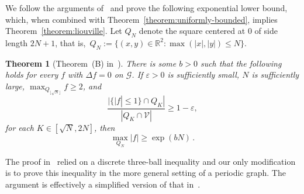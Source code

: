 \documentclass{daj}
\newtheorem{theorem}{Theorem}[section]
\newcommand{\G}{\mathcal{G}}
\newcommand{\V}{\mathcal{V}}
\newcommand{\eps}{\varepsilon}
\begin{document}
We follow the arguments of~\cite{buhovsky2022discrete} and prove the following exponential lower bound, which, when combined with Theorem~\ref{theorem:uniformly-bounded}, implies Theorem~\ref{theorem:liouville}. Let $Q_N$ denote the square centered at 0 of side length $2 N+1$, that is,~$Q_N := \{ (x,y) \in \mathbb{R}^2 : \max(|x|, |y| ) \leq N\}$.
\begin{theorem}[Theorem~(B) in~\cite{buhovsky2022discrete}]
	\label{theorem:lower-bound}
	There is some $b > 0$ such that the following holds for every $f$ with $\Delta f=0$ on $\G$. If $\varepsilon > 0$ is sufficiently small, $N$ is sufficiently large, $\max_{Q_{\lfloor \sqrt{N} \rfloor}} f \geq 2$, and
	\begin{equation*}
		\frac{|\{|f| \leq 1\} \cap Q_K|}{|Q_K \cap \V|} \geq 1-\eps,
	\end{equation*}
	for each $K \in [\sqrt{N}, 2N]$, then
	\begin{equation}
		\label{eq:exp-growth-statement}
		\max_{Q_{N}} |f| \geq \exp(bN) \, .
	\end{equation}
\end{theorem}
The proof in~\cite{buhovsky2022discrete} relied on a discrete three-ball inequality and our only modification is to prove this inequality in the more general setting of a periodic graph. The argument is effectively a simplified version of that in~\cite{armstrong2023large}.
\end{document}
